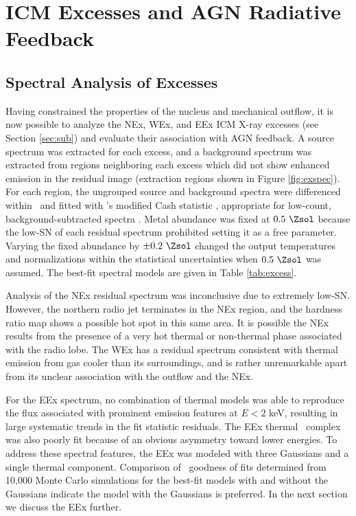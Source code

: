 \documentclass[useAMS,usenatbib]{mn2e}
\begin{document}
\section{ICM Excesses and AGN Radiative Feedback}
\label{sec:rad}

\subsection{Spectral Analysis of Excesses}

Having constrained the properties of the nucleus and mechanical
outflow, it is now possible to analyze the NEx, WEx, and EEx ICM X-ray
excesses (see Section \ref{sec:sub}) and evaluate their association
with AGN feedback. A source spectrum was extracted for each excess,
and a background spectrum was extracted from regions neighboring each
excess which did not show enhanced emission in the residual image
(extraction regions shown in Figure \ref{fig:exspec}). For each
region, the ungrouped source and background spectra were differenced
within \xspec\ and fitted with \xspec's modified Cash statistic
\citep{1979ApJ...228..939C}, appropriate for low-count,
background-subtracted spectra \citep[see \xspec\ Manual Appendix B
  and][]{1989ApJ...342.1207N}. Metal abundance was fixed at $0.5
~\Zsol$ because the low-SN of each residual spectrum prohibited
setting it as a free parameter. Varying the fixed abundance by $\pm
0.2 ~\Zsol$ changed the output temperatures and normalizations within
the statistical uncertainties when $0.5 ~\Zsol$ was assumed. The
best-fit spectral models are given in Table \ref{tab:excess}.

Analysis of the NEx residual spectrum was inconclusive due to
extremely low-SN. However, the northern radio jet terminates in the
NEx region, and the hardness ratio map shows a possible hot spot in
this same area. It is possible the NEx results from the presence of a
very hot thermal or non-thermal phase associated with the radio
lobe. The WEx has a residual spectrum consistent with thermal emission
from gas cooler than its surroundings, and is rather unremarkable
apart from its unclear association with the outflow and the NEx.

For the EEx spectrum, no combination of thermal models was able to
reproduce the flux associated with prominent emission features at $E <
2$ keV, resulting in large systematic trends in the fit statistic
residuals. The EEx thermal \feka\ complex was also poorly fit because
of an obvious asymmetry toward lower energies. To address these
spectral features, the EEx was modeled with three Gaussians and a
single thermal component. Comparison of \chisq\ goodness of fits
determined from 10,000 Monte Carlo simulations for the best-fit models
with and without the Gaussians indicate the model with the Gaussians
is preferred. In the next section we discuss the EEx further.
\end{document}
